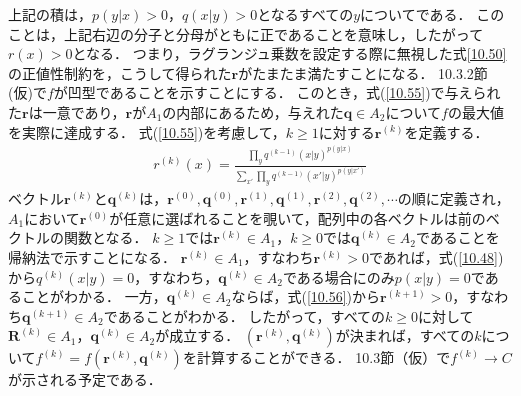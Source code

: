 \documentclass{ltjsarticle}
\theoremstyle{definition}
\begin{document}
上記の積は，$p(y|x)>0$，$q(x|y)>0$となるすべての$y$についてである．
このことは，上記右辺の分子と分母がともに正であることを意味し，したがって$r(x)>0$となる．
つまり，ラグランジュ乗数を設定する際に無視した式{\ref{10.50}}の正値性制約を，こうして得られた$\mathbf{r}$がたまたま満たすことになる．
10.3.2節(仮)で$f$が凹型であることを示すことにする．
このとき，式(\ref{10.55})で与えられた$\mathbf{r}$は一意であり，$\mathbf{r}$が$A_1$の内部にあるため，与えれた$\mathbf{q} \in A_2$について$f$の最大値を実際に達成する．
式(\ref{10.55})を考慮して，$k \geq 1$に対する$\mathbf{r}^{(k)}$を定義する．
\begin{eqnarray}
  \label{10.56}
  r^{(k)}(x) = \frac{\prod_{y} q^{(k-1)}(x|y)^{p(y|x)}}{\sum_{x'} \prod_{y} q^{(k-1)}(x'|y)^{p(y|x')}}
\end{eqnarray}
ベクトル$\mathbf{r}^{(k)}$と$\mathbf{q}^{(k)}$は，$\mathbf{r}^{(0)}, \mathbf{q}^{(0)}, \mathbf{r}^{(1)}, \mathbf{q}^{(1)}, \mathbf{r}^{(2)}, \mathbf{q}^{(2)}, \cdots$の順に定義され，$A_1$において$\mathbf{r}^{(0)}$が任意に選ばれることを覗いて，配列中の各ベクトルは前のベクトルの関数となる．
$k \geq 1$では$\mathbf{r}^{(k)} \in A_1$，$k \geq 0$では$\mathbf{q}^{(k)} \in A_2$であることを帰納法で示すことになる．
$\mathbf{r}^{(k)} \in A_1$，すなわち$\mathbf{r}^{(k)} > 0$であれば，式(\ref{10.48})から$q^{(k)}(x|y)=0$，すなわち，$\mathbf{q}^{(k)} \in A_2$である場合にのみ$p(x|y)=0$であることがわかる．
一方，$\mathbf{q}^{(k)} \in A_2$ならば，式(\ref{10.56})から$\mathbf{r}^{(k+1)}>0$，すなわち$\mathbf{q}^{(k+1)} \in A_2$であることがわかる．
したがって，すべての$k \geq 0$に対して$\mathbf{R}^{(k)} \in A_1$，$\mathbf{q}^{(k)} \in A_2$が成立する．
$(\mathbf{r}^{(k)}, \mathbf{q}^{(k)})$が決まれば，すべての$k$について$f^{(k)} = f(\mathbf{r}^{(k)}, \mathbf{q}^{(k)})$を計算することができる．
10.3節（仮）で$f^{(k)} \rightarrow C$が示される予定である．
\end{document}
